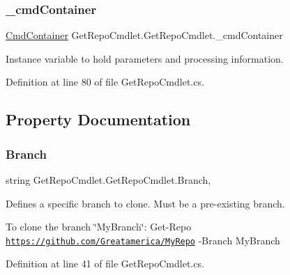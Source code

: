 \subsubsection{\texorpdfstring{\+\_\+cmd\+Container}{\_cmdContainer}}
{\footnotesize\ttfamily \mbox{\hyperlink{class_get_repo_cmdlet_1_1_cmd_container}{Cmd\+Container}} Get\+Repo\+Cmdlet.\+Get\+Repo\+Cmdlet.\+\_\+cmd\+Container\hspace{0.3cm}{\ttfamily [private]}}



Instance variable to hold parameters and processing information. 



Definition at line 80 of file Get\+Repo\+Cmdlet.\+cs.



\subsection{Property Documentation}
\mbox{\label{class_get_repo_cmdlet_1_1_get_repo_cmdlet_ac98a9c9f16239f0dfd0d3649a79a66e5}} 
\subsubsection{\texorpdfstring{Branch}{Branch}}
{\footnotesize\ttfamily string Get\+Repo\+Cmdlet.\+Get\+Repo\+Cmdlet.\+Branch\hspace{0.3cm}{\ttfamily [get]}, {\ttfamily [set]}}



Defines a specific branch to clone. Must be a pre-\/existing branch. 

To clone the branch \char`\"{}\+My\+Branch\char`\"{}\+: Get-\/\+Repo \href{https://github.com/Greatamerica/MyRepo}{\tt https\+://github.\+com/\+Greatamerica/\+My\+Repo} -\/\+Branch My\+Branch 

Definition at line 41 of file Get\+Repo\+Cmdlet.\+cs.

\mbox{\label{class_get_repo_cmdlet_1_1_get_repo_cmdlet_a9e8a15001d9ad8bc691ebfb75a7a5993}} 

